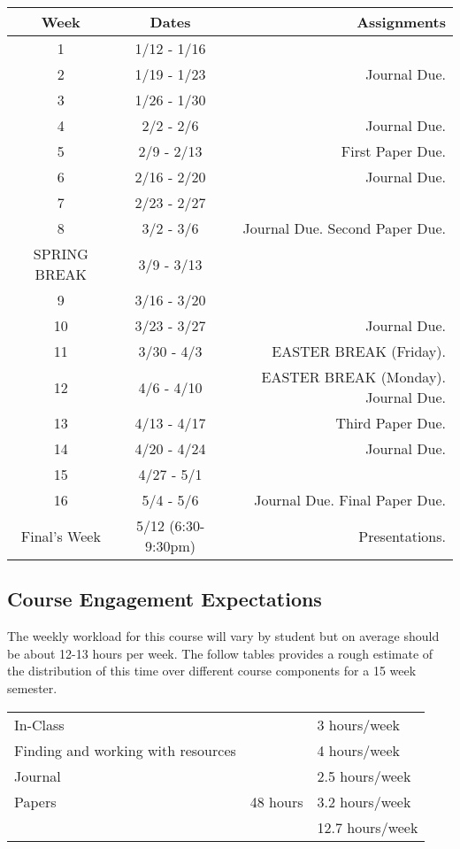 \documentclass[]{tufte-handout}
\begin{document}
\begin{center}
\begin{tabular}{|c|c|r|}
\hline 
Week & Dates & Assignments \\
\hline
1 & 1/12 - 1/16 &  \\
\hline
2 & 1/19 - 1/23 & Journal Due. \\
\hline
3 & 1/26 - 1/30 &   \\
\hline
4 & 2/2 - 2/6 & Journal Due.  \\
\hline
5 & 2/9 - 2/13 &  First Paper Due.\\
\hline
6 & 2/16 - 2/20 & Journal Due. \\
\hline
7 & 2/23 - 2/27 &   \\
\hline
8 & 3/2 - 3/6 & Journal Due. Second Paper Due.  \\
\hline 
SPRING BREAK & 3/9 - 3/13 &  \\
\hline
9 & 3/16 - 3/20 &  \\
\hline
10 & 3/23 - 3/27 & Journal Due. \\
\hline
11 & 3/30 - 4/3 &  EASTER BREAK (Friday).\\
\hline
12 & 4/6 - 4/10 & EASTER BREAK (Monday). Journal Due. \\
\hline
13 & 4/13 - 4/17 &   Third Paper Due.\\
\hline
14 & 4/20 - 4/24 &  Journal Due. \\
\hline
15 & 4/27 - 5/1 &  \\ 
\hline
16 & 5/4 - 5/6 & Journal Due. Final Paper Due.\\
\hline
Final's Week & 5/12 (6:30-9:30pm) & Presentations. \\ 
\hline
\end{tabular}
\end{center}

\subsection{Course Engagement Expectations}

The weekly workload for this course will vary by student but on average should be about 12-13 hours per week.  The follow tables provides a rough estimate of the distribution of this time over different course components for a 15 week semester. 
\begin{center}
\begin{tabular}{|l|l|l|}
\hline
In-Class &      & 3 hours/week \\ 
Finding and working with resources &        & 4 hours/week \\
Journal &   & 2.5 hours/week \\ 
Papers & 48 hours & 3.2 hours/week \\
\hline 
& & 12.7 hours/week \\ 
\hline
\end{tabular}
\end{center}

    
\end{document}
